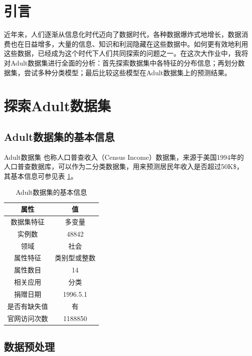 \documentclass[12pt,a4paper]{article}
\theoremstyle{definition}
\begin{document}
\section{引言}

近年来，人们逐渐从信息化时代迈向了数据时代，各种数据爆炸式地增长，数据消费也在日益增多，大量的信息、知识和利润隐藏在这些数据中。如何更有效地利用这些数据，已经成为这个时代下人们共同探索的问题之一。在这次大作业中，我将对Adult数据集进行全面的分析：首先探索数据集中各特征的分布信息；再划分数据集，尝试多种分类模型；最后比较这些模型在Adult数据集上的预测结果。

\section{探索Adult数据集}

\subsection{Adult数据集的基本信息}

Adult数据集 \cite{Dataset} 也称人口普查收入（Census Income）数据集，来源于美国1994年的人口普查数据库，可以作为二分类数据集，用来预测居民年收入是否超过50K\$，其基本信息可参见表 \ref{tab:basic-info}。

\begin{table}[H]
	\renewcommand\arraystretch{1.35}
	\caption{Adult数据集的基本信息}
	\label{tab:basic-info}
	\centering
	
	\begin{tabular}{c|c}
		\centering
		属性 & 值 \\
		\hline
		\hline
		数据集特征 & 多变量 \\
		实例数 & 48842 \\
		领域 & 社会 \\
		属性特征 & 类别型或整数 \\
		属性数目 & 14 \\
		相关应用 & 分类 \\
		捐赠日期 & 1996.5.1 \\
		是否有缺失值 & 有 \\
		官网访问次数 & 1188850 \\
	\end{tabular}
\end{table}

\subsection{数据预处理}
\end{document}
